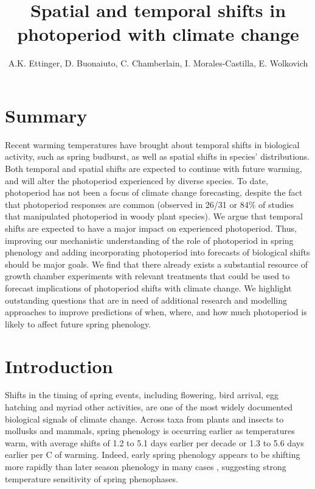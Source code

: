 \documentclass{article}
\begin{document}
 
\title{Spatial and temporal shifts in photoperiod with climate change} %

\author{A.K. Ettinger, D. Buonaiuto, C. Chamberlain, I. Morales-Castilla, E. Wolkovich}
\maketitle  %


\section*{Summary}
Recent warming temperatures have brought about temporal shifts in biological activity, such as spring budburst, as well as spatial shifts in species' distributions. Both temporal and spatial shifts are expected to continue with future warming, and will alter the photoperiod experienced by diverse species. To date, photoperiod has not been a focus of climate change forecasting, despite the fact that photoperiod responses are common (observed in 26/31 or 84\% of studies that manipulated photoperiod in woody plant species). We argue that temporal shifts are expected to have a major impact on experienced photoperiod. Thus, improving our mechanistic understanding of the role of photoperiod in spring phenology and adding incorporating photoperiod into forecasts of biological shifts should be major goals. We find that there already exists a substantial resource of growth chamber experiments with relevant treatments that could be used to forecast implications of photoperiod shifts with climate change. We highlight outstanding questions that are in need of additional research and modelling approaches to improve predictions of when, where, and how much photoperiod is likely to affect future spring phenology.

\section*{Introduction}
\par Shifts in the timing of spring events, including flowering, bird arrival, egg hatching and myriad other activities, are one of the most widely documented biological signals of climate change. Across taxa from plants and insects to mollusks and mammals, spring phenology is occurring earlier as temperatures warm, with average shifts of 1.2 to 5.1 days earlier per decade \citep{bradley1999,parmesan2003, root2003} or 1.3 to 5.6 days earlier per \degree C of warming\citep{wolkovich2012,polgar2013}. Indeed, early spring phenology appears to be shifting more rapidly than later season phenology in many cases \citep{bradley1999,menzel2006}, suggesting strong temperature sensitivity of spring phenophases.
\end{document}
